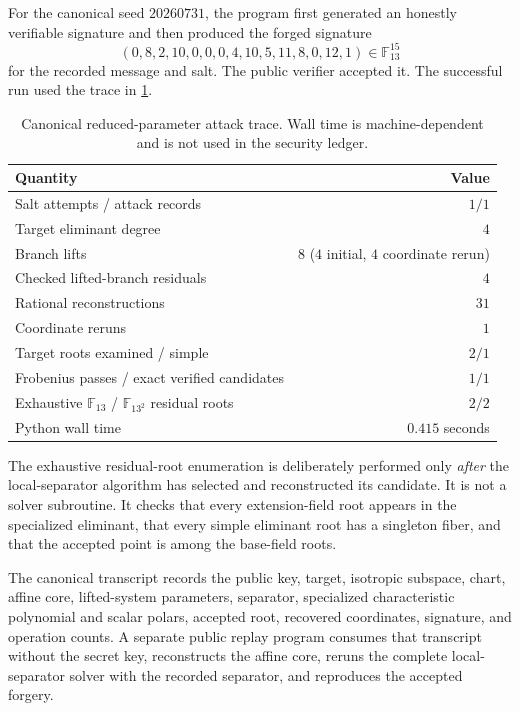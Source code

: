 \documentclass[11pt,a4paper]{article}
\theoremstyle{definition}
\theoremstyle{remark}
\newcommand{\F}{\mathbb F}
\begin{document}
For the canonical seed $20260731$, the program first generated an honestly verifiable signature and then produced the forged signature
\[
 (0,8,2,10,0,0,0,4,10,5,11,8,0,12,1)
 \in\F_{13}^{15}
\]
for the recorded message and salt.  The public verifier accepted it.  The successful run used the trace in \cref{tab:toytrace}.

\begin{table}[H]
\centering
\caption{Canonical reduced-parameter attack trace.  Wall time is machine-dependent and is not used in the security ledger.}
\label{tab:toytrace}
\begin{tabular}{@{}lr@{}}
\toprule
Quantity & Value\\
\midrule
Salt attempts / attack records & $1/1$\\
Target eliminant degree & $4$\\
Branch lifts & $8$ ($4$ initial, $4$ coordinate rerun)\\
Checked lifted-branch residuals & $4$\\
Rational reconstructions & $31$\\
Coordinate reruns & $1$\\
Target roots examined / simple & $2/1$\\
Frobenius passes / exact verified candidates & $1/1$\\
Exhaustive $\F_{13}$ / $\F_{13^2}$ residual roots & $2/2$\\
Python wall time & $0.415$ seconds\\
\bottomrule
\end{tabular}
\end{table}

The exhaustive residual-root enumeration is deliberately performed only \emph{after} the local-separator algorithm has selected and reconstructed its candidate.  It is not a solver subroutine.  It checks that every extension-field root appears in the specialized eliminant, that every simple eliminant root has a singleton fiber, and that the accepted point is among the base-field roots.

The canonical transcript records the public key, target, isotropic subspace, chart, affine core, lifted-system parameters, separator, specialized characteristic polynomial and scalar polars, accepted root, recovered coordinates, signature, and operation counts.  A separate public replay program consumes that transcript without the secret key, reconstructs the affine core, reruns the complete local-separator solver with the recorded separator, and reproduces the accepted forgery.
\end{document}
